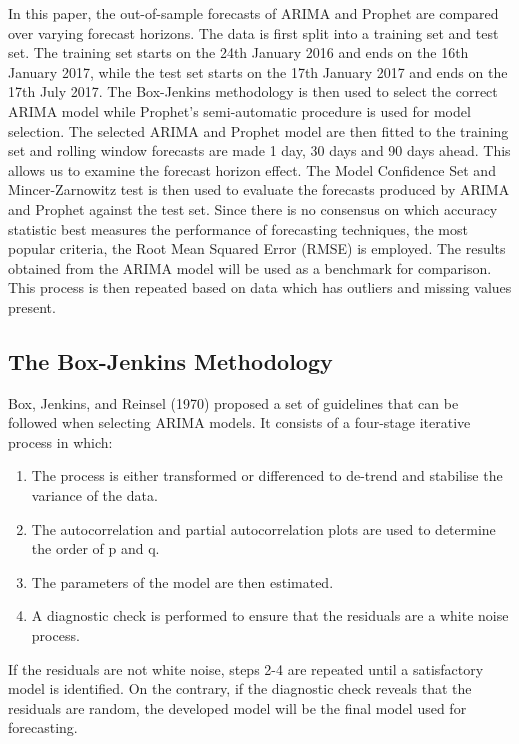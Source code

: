 \documentclass[12pt,a4paper]{article}
\numberwithin{equation}{section}
\numberwithin{figure}{section}
\numberwithin{table}{section}
\def\tightlist{}
\begin{document}
In this paper, the out-of-sample forecasts of ARIMA and Prophet are
compared over varying forecast horizons. The data is first split into a
training set and test set. The training set starts on the 24th January
2016 and ends on the 16th January 2017, while the test set starts on the
17th January 2017 and ends on the 17th July 2017. The Box-Jenkins
methodology is then used to select the correct ARIMA model while
Prophet's semi-automatic procedure is used for model selection. The
selected ARIMA and Prophet model are then fitted to the training set and
rolling window forecasts are made 1 day, 30 days and 90 days ahead. This
allows us to examine the forecast horizon effect. The Model Confidence
Set and Mincer-Zarnowitz test is then used to evaluate the forecasts
produced by ARIMA and Prophet against the test set. Since there is no
consensus on which accuracy statistic best measures the performance of
forecasting techniques, the most popular criteria, the Root Mean Squared
Error (RMSE) is employed. The results obtained from the ARIMA model will
be used as a benchmark for comparison. This process is then repeated
based on data which has outliers and missing values present.

\subsection{The Box-Jenkins
Methodology}\label{the-box-jenkins-methodology}

Box, Jenkins, and Reinsel (1970) proposed a set of guidelines that can
be followed when selecting ARIMA models. It consists of a four-stage
iterative process in which:

\begin{enumerate}
\def\labelenumi{\arabic{enumi}.}
\tightlist
\item
  The process is either transformed or differenced to de-trend and
  stabilise the variance of the data.
\item
  The autocorrelation and partial autocorrelation plots are used to
  determine the order of p and q.
\item
  The parameters of the model are then estimated.
\item
  A diagnostic check is performed to ensure that the residuals are a
  white noise process.
\end{enumerate}

If the residuals are not white noise, steps 2-4 are repeated until a
satisfactory model is identified. On the contrary, if the diagnostic
check reveals that the residuals are random, the developed model will be
the final model used for forecasting.
\end{document}

